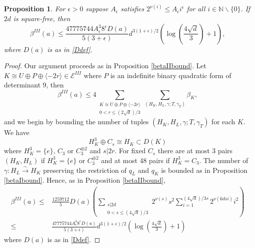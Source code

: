 \documentclass[12pt, a4paper]{article}
\newtheorem{proposition}[thm]{Proposition}
\newcommand{\NN}{\mathbb{N}}
\newcommand{\la}{\langle}
\newcommand{\ra}{\rangle}
\newcommand{\ec}{\mathcal{E}}
\newcommand{\opn}{\operatorname}
\newcommand{\op}{\oplus}
\begin{document}
\begin{proposition}\label{betaIIIbound}
  For $\epsilon>0$ suppose $A_{\epsilon}$ satisfies $2^{\nu(i)} \leq A_{\epsilon} i^{\epsilon}$ for all $i \in \NN \backslash \{0\}$.
  If $2d$ is square-free, then 
  \begin{equation*}
    \beta^{III} (a) \leq
    \frac{47775744 A_{\epsilon}^3 8^{\epsilon} D(a)}{5(3 + \epsilon)} d^{3(1+\epsilon)/2}\left ( \opn{log} \left ( \frac{4 \sqrt{d}}{3} \right ) + 1 \right ),
  \end{equation*}
  where $D(a)$ is as in \eqref{Ddef}.
\end{proposition}
\begin{proof}
  Our argument proceeds as in Proposition \ref{betaIIbound}. 
  Let $K \cong U \op P \op \la -2r \ra \in \ec^{III}$ where $P$ is an indefinite binary quadratic form of determinant 9, 
then 
  \begin{equation*}
    \beta^{III}(a) \leq
    4 \sum_{\substack{K \cong U \op P \op \la -2r \ra \\ 0<r \leq (2 \sqrt{d})/3}}
    \sum_{(H_K, H_L, \gamma; T, \gamma_T)} \beta_K,
  \end{equation*}
  and we begin by bounding the number of tuples $(H_K, H_L, \gamma; T, \gamma_T)$ for each $K$.
We have 
  \[
  H_K^3 \op C_s \cong H_K  \subset D(K)
\] 
  where  $H_K^3 = \{e \}$, $C_3$ or $C_3^{\op 2}$ and $s \vert 2r$.
  For fixed $C_s$  there are
  at most 3 pairs $(H_K, H_L)$ if $H_K^3 = \{ e \}$ or $C_3^{\op 2}$ and at most 48 pairs if $H_K^3 = C_3$.
  The number of $\gamma: H_L \xrightarrow{\sim} H_K$ preserving the restriction of $q_L$ and $q_K$ is bounded as in Proposition \ref{betaIbound}.
Hence, as in Proposition \ref{betaIIbound}, 
  \begin{align*}
    \beta^{III}(a)
    \leq & \frac{1259712}{5} D(a) \left( \sum_{\substack{s \vert 2d \\ 0<s \leq (4 \sqrt{d})/3 }}  2^{\nu(s)} s^2  
    \sum_{i=1}^{(4 \sqrt{d})/3s} 2^{\nu(6dsi)} i^2 \right ) \\
    \leq & \frac{47775744 A_{\epsilon}^3 8^{\epsilon} D(a)}{5(3 + \epsilon)} d^{3(1+\epsilon)/2}\left ( \opn{log} \left ( \frac{4 \sqrt{d}}{3} \right )+ 1 \right ) 
  \end{align*}
  where $D(a)$ is as in \eqref{Ddef}.
\end{proof}
\end{document}
